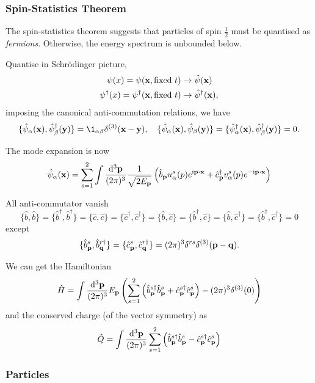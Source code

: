 \documentclass[a4paper,11pt]{article}
\begin{document}
	\subsubsection{Spin-Statistics Theorem}
	The spin-statistics theorem suggests that particles of spin $\frac{1}{2}$ must be quantised as \emph{fermions}. Otherwise, the energy spectrum is unbounded below.

	Quantise in Schr\"odinger picture,
	\begin{align*}
		\psi(x) = \psi(\vb x, \text{fixed } t) &\to \hat \psi(\vb x)\\
		\psi^{\dagger}(x) = \psi^{\dagger}(\vb x, \text{fixed } t) &\to \hat \psi^{\dagger}(\vb x),
	\end{align*}
	imposing the canonical anti-commutation relations, we have 
	\[
		\{\hat \psi_\alpha(\vb x), \hat \psi^{\dagger}_\beta(\vb y)\} = \1 _{\alpha \beta} \delta ^{(3)}(\vb x - \vb y), \quad \{\hat \psi_\alpha(\vb x), \hat \psi_\beta(\vb y)\} = \{\hat \psi^{\dagger}_\alpha(\vb x),\hat \psi^{\dagger}_\beta(\vb y)\} = 0.
	\]

	The mode expansion is now 
	\[
		\hat \psi_\alpha(\vb x) = \sum _{s = 1}^2 \int \ddk{\vb p}{3} \frac{1}{\sqrt{2 E _{\vb p}}} \left( \hat b _{\vb p} u^s_\alpha(p) e ^{\mathrm{i} \vb p \vdot \vb x} + \hat c^{\dagger}_{\vb p} v^s_\alpha(p) e ^{-\mathrm{i} \vb p \vdot \vb x} \right)
	\]
	
	\begin{exer}[Sheet 3]
		All anti-commutator vanish 
		\[
			\{\hat b, \hat b\} = \{\hat b^{\dagger}, \hat b^{\dagger}\} = \{\hat c, \hat c\} = \{\hat c^{\dagger}, \hat c^{\dagger}\} = \{\hat b, \hat c\} = \{\hat b^{\dagger},\hat c\} = \{\hat b, \hat c^{\dagger}\} = \{\hat b^{\dagger},\hat c^{\dagger}\} = 0
		\]
		except
		\[
			\{\hat b^s _{\vb p}, \hat b^{r\dagger} _{\vb q}\} = \{\hat c^s _{\vb p}, \hat c^{r\dagger} _{\vb q}\} = (2 \pi)^3 \delta ^{rs} \delta ^{(3)}(\vb p - \vb q).
		\]
	\end{exer}
	
	We can get the Hamiltonian 
	\[
		\hat H = \int \frac{\dd[3]{\vb p}}{(2\pi)^{3}} E _{\vb p} \left( \sum _{s = 1}^2 \left( \hat b^{s\dagger}_{\vb p} \hat b^s _{\vb p} + \hat c^{s\dagger}_{\vb p} \hat c^s _{\vb p} \right) - (2 \pi)^3 \delta ^{(3)}(0)\right)
	\]
	and the conserved charge (of the vector symmetry) as 
	\[
		\hat Q = \int \frac{\dd[3]{\vb p}}{(2\pi)^{3}} \sum _{s = 1}^2 \left( \hat b^{s\dagger}_{\vb p} \hat b^s _{\vb p} - \hat c^{s\dagger}_{\vb p} \hat c^s _{\vb p} \right)
	\]
	
	\subsubsection{Particles}
\end{document}
